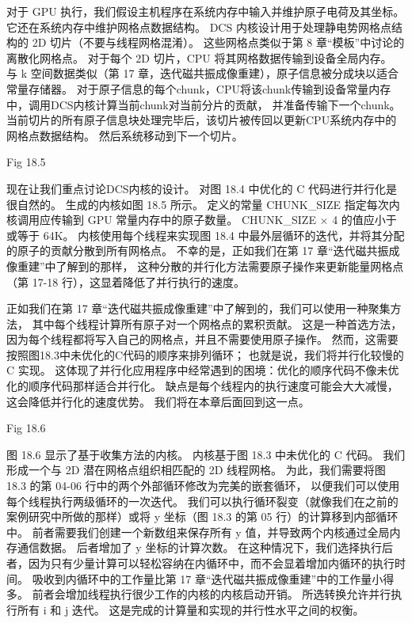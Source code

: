 对于 GPU 执行，我们假设主机程序在系统内存中输入并维护原子电荷及其坐标。 它还在系统内存中维护网格点数据结构。 
DCS 内核设计用于处理静电势网格点结构的 2D 切片（不要与线程网格混淆）。 
这些网格点类似于第 8 章“模板”中讨论的离散化网格点。 对于每个 2D 切片，CPU 将其网格数据传输到设备全局内存。 
与 k 空间数据类似（第 17 章，迭代磁共振成像重建），原子信息被分成块以适合常量存储器。 
对于原子信息的每个chunk，CPU将该chunk传输到设备常量内存中，调用DCS内核计算当前chunk对当前分片的贡献，
并准备传输下一个chunk。 当前切片的所有原子信息块处理完毕后，该切片被传回以更新CPU系统内存中的网格点数据结构。 
然后系统移动到下一个切片。

{\color{red} Fig 18.5}

现在让我们重点讨论DCS内核的设计。 对图 18.4 中优化的 C 代码进行并行化是很自然的。 生成的内核如图 18.5 所示。 
定义的常量 CHUNK\_SIZE 指定每次内核调用应传输到 GPU 常量内存中的原子数量。 CHUNK\_SIZE × 4 的值应小于或等于 64K。 
内核使用每个线程来实现图 18.4 中最外层循环的迭代，并将其分配的原子的贡献分散到所有网格点。 
不幸的是，正如我们在第 17 章“迭代磁共振成像重建”中了解到的那样，
这种分散的并行化方法需要原子操作来更新能量网格点（第 17-18 行），这显着降低了并行执行的速度。

正如我们在第 17 章“迭代磁共振成像重建”中了解到的，我们可以使用一种聚集方法，
其中每个线程计算所有原子对一个网格点的累积贡献。 
这是一种首选方法，因为每个线程都将写入自己的网格点，并且不需要使用原子操作。 
然而，这需要按照图18.3中未优化的C代码的顺序来排列循环； 也就是说，我们将并行化较慢的 C 实现。 
这体现了并行化应用程序中经常遇到的困境：优化的顺序代码不像未优化的顺序代码那样适合并行化。 
缺点是每个线程内的执行速度可能会大大减慢，这会降低并行化的速度优势。 我们将在本章后面回到这一点。

{\color{red} Fig 18.6}

图 18.6 显示了基于收集方法的内核。 内核基于图 18.3 中未优化的 C 代码。 
我们形成一个与 2D 潜在网格点组织相匹配的 2D 线程网格。 
为此，我们需要将图 18.3 的第 04-06 行中的两个外部循环修改为完美的嵌套循环，
以便我们可以使用每个线程执行两级循环的一次迭代。 
我们可以执行循环裂变（就像我们在之前的案例研究中所做的那样）或将 y 坐标（图 18.3 的第 05 行）的计算移到内部循环中。 
前者需要我们创建一个新数组来保存所有 y 值，并导致两个内核通过全局内存通信数据。 后者增加了 y 坐标的计算次数。 
在这种情况下，我们选择执行后者，因为只有少量计算可以轻松容纳在内循环中，而不会显着增加内循环的执行时间。 
吸收到内循环中的工作量比第 17 章“迭代磁共振成像重建”中的工作量小得多。 前者会增加线程执行很少工作的内核的内核启动开销。 
所选转换允许并行执行所有 i 和 j 迭代。 这是完成的计算量和实现的并行性水平之间的权衡。

